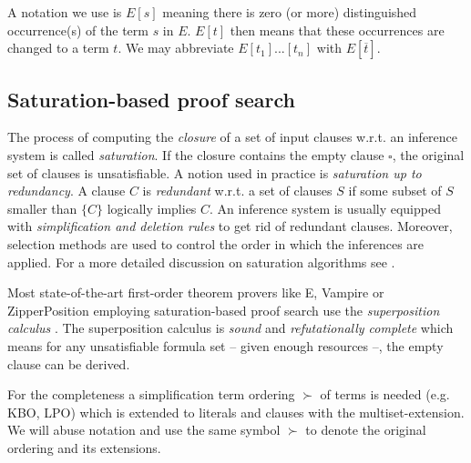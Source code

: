 A notation we use is $E[s]$ meaning there is zero (or more) distinguished occurrence(s) of the term $s$ in $E$. $E[t]$ then means that these occurrences are changed to a term $t$. We may abbreviate $E[t_1]...[t_n]$ with $E[\overline{t}]$.

\subsection{Saturation-based proof search}
The process of computing the \textit{closure} of a set of input clauses w.r.t. an inference system is called \textit{saturation}. If the closure contains the empty clause $\square$, the original set of clauses is unsatisfiable. A notion used in practice is \textit{saturation up to redundancy}. A clause $C$ is \textit{redundant} w.r.t. a set of clauses $S$ if some subset of $S$ smaller than $\{C\}$ logically implies $C$. An inference system is usually equipped with \textit{simplification and deletion rules} to get rid of redundant clauses. Moreover, selection methods are used to control the order in which the inferences are applied. For a more detailed discussion on saturation algorithms see \cite{cav13}.

Most state-of-the-art first-order theorem provers like E, Vampire or ZipperPosition employing saturation-based proof search use the \textit{superposition calculus} \cite{handbookofar}. The superposition calculus is \textit{sound} and \textit{refutationally complete} which means for any unsatisfiable formula set -- given enough resources --, the empty clause can be derived.

For the completeness a simplification term ordering $\succ$ of terms is needed (e.g. KBO, LPO) which is extended to literals and clauses with the multiset-extension. We will abuse notation and use the same symbol $\succ$ to denote the original ordering and its extensions.

